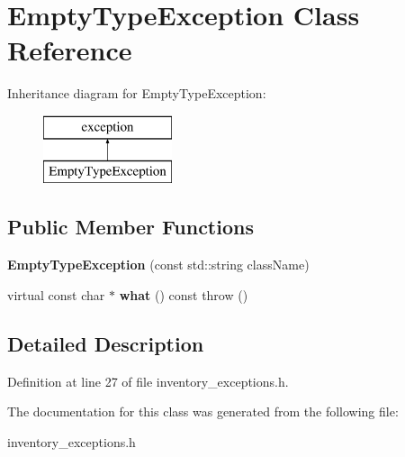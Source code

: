 \hypertarget{class_empty_type_exception}{}\section{Empty\+Type\+Exception Class Reference}
\label{class_empty_type_exception}
Inheritance diagram for Empty\+Type\+Exception\+:\begin{figure}[H]
\begin{center}
\leavevmode
\includegraphics[height=2.000000cm]{class_empty_type_exception}
\end{center}
\end{figure}
\subsection*{Public Member Functions}
\begin{DoxyCompactItemize}
\item 
\hypertarget{class_empty_type_exception_a9396f7f0f9f5cb84f60759a48a3f3590}{}\label{class_empty_type_exception_a9396f7f0f9f5cb84f60759a48a3f3590} 
{\bfseries Empty\+Type\+Exception} (const std\+::string class\+Name)
\item 
\hypertarget{class_empty_type_exception_af5d4c57db2ef804da89c720794fead3f}{}\label{class_empty_type_exception_af5d4c57db2ef804da89c720794fead3f} 
virtual const char $\ast$ {\bfseries what} () const  throw ()
\end{DoxyCompactItemize}


\subsection{Detailed Description}


Definition at line 27 of file inventory\+\_\+exceptions.\+h.



The documentation for this class was generated from the following file\+:\begin{DoxyCompactItemize}
\item 
inventory\+\_\+exceptions.\+h\end{DoxyCompactItemize}
